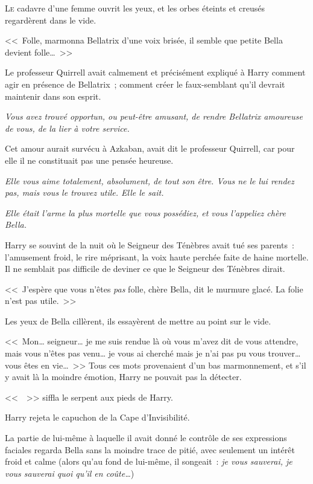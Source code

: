 
\lettrine{L}{e} cadavre d'une femme ouvrit les yeux, et les orbes éteints et creusés regardèrent dans le vide.

<<~Folle, marmonna Bellatrix d'une voix brisée, il semble que petite Bella devient folle…~>>

Le professeur Quirrell avait calmement et précisément expliqué à Harry comment agir en présence de Bellatrix~; comment créer le faux-semblant qu'il devrait maintenir dans son esprit.

\emph{Vous avez trouvé opportun, ou peut-être amusant, de rendre Bellatrix amoureuse de vous, de la lier à votre service.}

Cet amour aurait survécu à Azkaban, avait dit le professeur Quirrell, car pour elle il ne constituait pas une pensée heureuse.

\emph{Elle vous aime totalement, absolument, de tout son être. Vous ne le lui rendez pas, mais vous le trouvez utile. Elle le sait.}

\emph{Elle était l'arme la plus mortelle que vous possédiez, et vous l'appeliez chère Bella.}

Harry se souvint de la nuit où le Seigneur des Ténèbres avait tué ses parents~: l'amusement froid, le rire méprisant, la voix haute perchée faite de haine mortelle. Il ne semblait pas difficile de deviner ce que le Seigneur des Ténèbres dirait.

<<~J'espère que vous n'êtes \emph{pas} folle, chère Bella, dit le murmure glacé. La folie n'est pas utile.~>>

Les yeux de Bella cillèrent, ils essayèrent de mettre au point sur le vide.

<<~Mon… seigneur… je me suis rendue là où vous m'avez dit de vous attendre, mais vous n'êtes pas venu… je vous ai cherché mais je n'ai pas pu vous trouver… vous êtes en vie…~>> Tous ces mots provenaient d'un bas marmonnement, et s'il y avait là la moindre émotion, Harry ne pouvait pas la détecter.

<<~~>> siffla le serpent aux pieds de Harry.

Harry rejeta le capuchon de la Cape d'Invisibilité.

La partie de lui-même à laquelle il avait donné le contrôle de ses expressions faciales regarda Bella sans la moindre trace de pitié, avec seulement un intérêt froid et calme (alors qu'au fond de lui-même, il songeait~: \emph{je vous sauverai, je vous sauverai quoi qu'il en coûte…})

